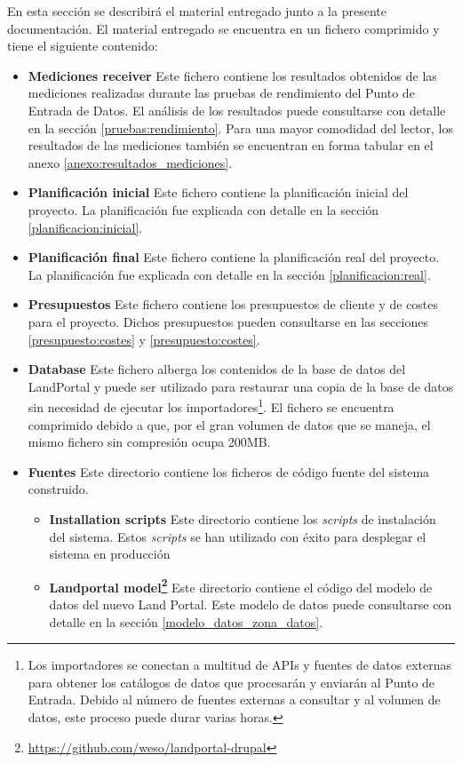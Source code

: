 En esta sección se describirá el material entregado junto a la presente documentación.  El material entregado se encuentra en un fichero comprimido y tiene el siguiente contenido:
\begin{itemize}
	\item \textbf{Mediciones receiver}  Este fichero contiene los resultados obtenidos de las mediciones realizadas durante las pruebas de rendimiento del Punto de Entrada de Datos.  El análisis de los resultados puede consultarse con detalle en la sección \ref{pruebas:rendimiento}.  Para una mayor comodidad del lector, los resultados de las mediciones también se encuentran en forma tabular en el anexo \ref{anexo:resultados_mediciones}.
	\item \textbf{Planificación inicial}  Este fichero contiene la planificación inicial del proyecto.  La planificación fue explicada con detalle en la sección \ref{planificacion:inicial}.
	\item \textbf{Planificación final}  Este fichero contiene la planificación real del proyecto.  La planificación fue explicada con detalle en la sección \ref{planificacion:real}.
	\item \textbf{Presupuestos}  Este fichero contiene los presupuestos de cliente y de costes para el proyecto.  Dichos presupuestos pueden consultarse en las secciones \ref{presupuesto:costes} y \ref{presupuesto:costes}.
	\item \textbf{Database}  Este fichero alberga los contenidos de la base de datos del LandPortal y puede ser utilizado para restaurar una copia de la base de datos sin necesidad de ejecutar los importadores\footnote{Los importadores se conectan a multitud de APIs y fuentes de datos externas para obtener los catálogos de datos que procesarán y enviarán al Punto de Entrada.  Debido al número de fuentes externas a consultar y al volumen de datos, este proceso puede durar varias horas.}.  El fichero se encuentra comprimido debido a que, por el gran volumen de datos que se maneja, el mismo fichero sin compresión ocupa 200MB.
	\item \textbf{Fuentes}  Este directorio contiene los ficheros de código fuente del sistema construido.
		\begin{itemize}
			\item \textbf{Installation scripts}  Este directorio contiene los \textit{scripts} de instalación del sistema.  Estos \textit{scripts} se han utilizado con éxito para desplegar el sistema en producción
			\item \textbf{Landportal model\footnote{\url{https://github.com/weso/landportal-drupal}}}  Este directorio contiene el código del modelo de datos del nuevo Land Portal.  Este modelo de datos puede consultarse con detalle en la sección \ref{modelo_datos_zona_datos}.

\end{itemize}
\end{itemize}
